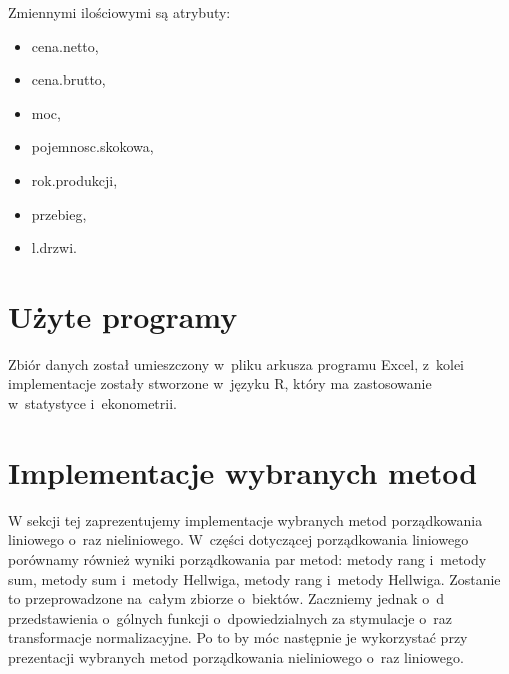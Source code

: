 \documentclass[12pt,a4paper]{report}
\begin{document}
Zmiennymi ilościowymi są atrybuty:
\begin{multicols}{3}
\begin{itemize}
 \item cena.netto,%
 \item cena.brutto,%
 \item moc,%
 \item pojemnosc.skokowa,%
 \item rok.produkcji, %
 \item przebieg,%
 \item l.drzwi. %
\end{itemize}
\end{multicols}

%

\section{Użyte programy}
Zbiór danych został umieszczony w~pliku arkusza programu Excel, z~kolei implementacje zostały stworzone w~języku R, który ma zastosowanie w~statystyce i~ekonometrii. 


\section{Implementacje wybranych metod}
W sekcji tej zaprezentujemy implementacje wybranych metod porządkowania liniowego o~raz nieliniowego. W~części dotyczącej porządkowania liniowego porównamy również wyniki porządkowania par metod: metody rang i~metody sum, metody sum i~metody Hellwiga, metody rang i~metody Hellwiga. Zostanie to przeprowadzone na~całym zbiorze o~biektów. 
Zaczniemy jednak o~d przedstawienia o~gólnych funkcji o~dpowiedzialnych za stymulacje o~raz transformacje normalizacyjne. Po to by móc następnie je wykorzystać przy prezentacji wybranych metod porządkowania nieliniowego o~raz liniowego. 
\end{document}
